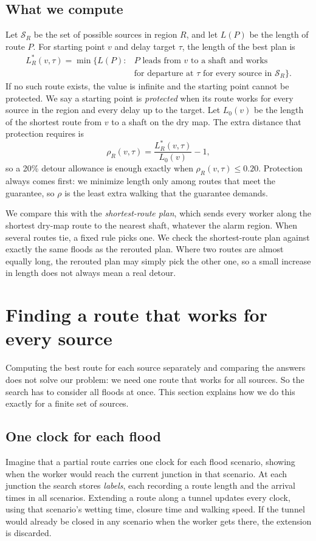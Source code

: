 \documentclass[11pt,a4paper]{article}
\newcommand{\Sc}{\mathcal{S}}
\begin{document}
\subsection{What we compute}
Let $\Sc_R$ be the set of possible sources in region $R$, and let $L(P)$ be the length of route $P$. For starting point $v$ and delay target $\tau$, the length of the best plan is
\begin{equation}
\begin{split}
 L_R^*(v,\tau)=\min\bigl\{L(P):{}&P\text{ leads from }v\text{ to a shaft and works}\\
 &\text{for departure at }\tau\text{ for every source in }\Sc_R\bigr\}.
\end{split}
 \label{eq:main}
\end{equation}
If no such route exists, the value is infinite and the starting point cannot be protected. We say a starting point is \emph{protected} when its route works for every source in the region and every delay up to the target. Let $L_0(v)$ be the length of the shortest route from $v$ to a shaft on the dry map. The extra distance that protection requires is
\[
 \rho_R(v,\tau)=\frac{L_R^*(v,\tau)}{L_0(v)}-1,
\]
so a 20\% detour allowance is enough exactly when $\rho_R(v,\tau)\le0.20$. Protection always comes first: we minimize length only among routes that meet the guarantee, so $\rho$ is the least extra walking that the guarantee demands.

We compare this with the \emph{shortest-route plan}, which sends every worker along the shortest dry-map route to the nearest shaft, whatever the alarm region. When several routes tie, a fixed rule picks one. We check the shortest-route plan against exactly the same floods as the rerouted plan. Where two routes are almost equally long, the rerouted plan may simply pick the other one, so a small increase in length does not always mean a real detour.

\section{Finding a route that works for every source}\label{sec:compute}
Computing the best route for each source separately and comparing the answers does not solve our problem: we need one route that works for all sources. So the search has to consider all floods at once. This section explains how we do this exactly for a finite set of sources.

\subsection{One clock for each flood}
Imagine that a partial route carries one clock for each flood scenario, showing when the worker would reach the current junction in that scenario. At each junction the search stores \emph{labels}, each recording a route length and the arrival times in all scenarios. Extending a route along a tunnel updates every clock, using that scenario's wetting time, closure time and walking speed. If the tunnel would already be closed in any scenario when the worker gets there, the extension is discarded.
\end{document}
